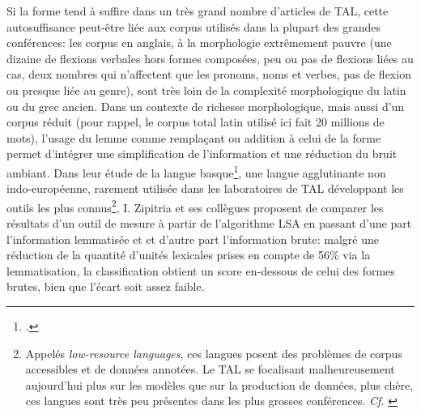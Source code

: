 Si la forme tend à suffire dans un très grand nombre d'articles de TAL, cette autosuffisance peut-être liée aux corpus utilisés dans la plupart des grandes conférences: les corpus en anglais, à la morphologie extrêmement pauvre (une dizaine de flexions verbales hors formes composées, peu ou pas de flexions liées au cas, deux nombres qui n'affectent que les pronoms, noms et verbes, pas de flexion ou presque liée au genre), sont très loin de la complexité morphologique du latin ou du grec ancien. Dans un contexte de richesse morphologique, mais aussi d'un corpus réduit (pour rappel, le corpus total latin utilisé ici fait 20 millions de mots), l'usage du lemme comme remplaçant ou addition à celui de la forme permet d'intégrer une simplification de l'information et une réduction du bruit ambiant. Dans leur étude de la langue basque\footcite{zipitria_observing_2006}, une langue agglutinante non indo-européenne, rarement utilisée dans les laboratoires de TAL développant les outils les plus connus\footnote{Appelés \textit{low-resource languages}, ces langues posent des problèmes de corpus accessibles et de données annotées. Le TAL se focalisant malheureusement aujourd'hui plus sur les modèles que sur la production de données, plus chère, ces langues sont très peu présentes dans les plus grosses conférences. \textit{Cf.} \textcite{magueresse_low-resource_2020}}, I. Zipitria et ses collègues proposent de comparer les résultats d'un outil de mesure à partir de l'algorithme LSA en passant d'une part l'information lemmatisée et et d'autre part l'information brute: malgré une réduction de la quantité d'unités lexicales prises en compte de 56\% via la lemmatisation, la classification obtient un score en-dessous de celui des formes brutes, bien que l'écart soit assez faible. 

